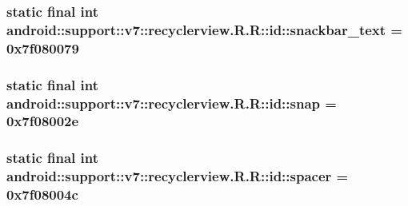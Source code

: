 \hypertarget{classandroid_1_1support_1_1v7_1_1recyclerview_1_1_r_1_1id_b867545d3c71b127e8a68a0974a41d9f}{
\subsubsection[{snackbar\_\-text}]{\setlength{\rightskip}{0pt plus 5cm}static final int android::support::v7::recyclerview.R.R::id::snackbar\_\-text = 0x7f080079}}
\label{classandroid_1_1support_1_1v7_1_1recyclerview_1_1_r_1_1id_b867545d3c71b127e8a68a0974a41d9f}


\hypertarget{classandroid_1_1support_1_1v7_1_1recyclerview_1_1_r_1_1id_988340680aebcf90a5486cfcf55a210f}{
\subsubsection[{snap}]{\setlength{\rightskip}{0pt plus 5cm}static final int android::support::v7::recyclerview.R.R::id::snap = 0x7f08002e}}
\label{classandroid_1_1support_1_1v7_1_1recyclerview_1_1_r_1_1id_988340680aebcf90a5486cfcf55a210f}


\hypertarget{classandroid_1_1support_1_1v7_1_1recyclerview_1_1_r_1_1id_800f0ac17a6874da8f870f934699b2d8}{
\subsubsection[{spacer}]{\setlength{\rightskip}{0pt plus 5cm}static final int android::support::v7::recyclerview.R.R::id::spacer = 0x7f08004c}}
\label{classandroid_1_1support_1_1v7_1_1recyclerview_1_1_r_1_1id_800f0ac17a6874da8f870f934699b2d8}


